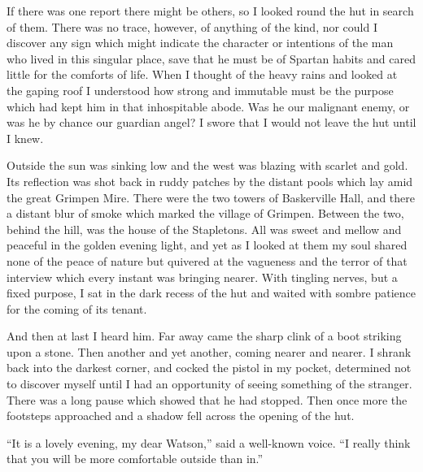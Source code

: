 \documentclass[paper=a5,BCOR=7mm,twoside,DIV=calc,12pt,usegeometry,openany,chapterprefix,endperiod,headings=big]{scrbook} %
\begin{document}
If there was one report there might be others, so I looked round the hut in search of them. There was no trace, however, of anything of the kind, nor could I discover any sign which might indicate the character or intentions of the man who lived in this singular place, save that he must be of Spartan habits and cared little for the comforts of life. When I thought of the heavy rains and looked at the gaping roof I understood how strong and immutable must be the purpose which had kept him in that inhospitable abode. Was he our malignant enemy, or was he by chance our guardian angel? I swore that I would not leave the hut until I knew.

Outside the sun was sinking low and the west was blazing with scarlet and gold. Its reflection was shot back in ruddy patches by the distant pools which lay amid the great Grimpen Mire. There were the two towers of Baskerville Hall, and there a distant blur of smoke which marked the village of Grimpen. Between the two, behind the hill, was the house of the Stapletons. All was sweet and mellow and peaceful in the golden evening light, and yet as I looked at them my soul shared none of the peace of nature but quivered at the vagueness and the terror of that interview which every instant was bringing nearer. With tingling nerves, but a fixed purpose, I sat in the dark recess of the hut and waited with sombre patience for the coming of its tenant.

And then at last I heard him. Far away came the sharp clink of a boot striking upon a stone. Then another and yet another, coming nearer and nearer. I shrank back into the darkest corner, and cocked the pistol in my pocket, determined not to discover myself until I had an opportunity of seeing something of the stranger. There was a long pause which showed that he had stopped. Then once more the footsteps approached and a shadow fell across the opening of the hut.

\enquote{It is a lovely evening, my dear Watson,} said a well-known voice. \enquote{I really think that you will be more comfortable outside than in.}
\end{document}
